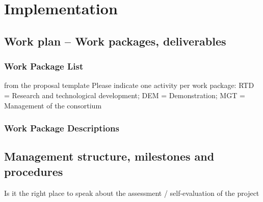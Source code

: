 \chapter{Implementation}\label{chap:implementation}

\section{Work plan -- Work packages, deliverables}



\subsection{Work Package List}\label{sec:wplist}

\begin{todo}{from the proposal template}
Please indicate one activity per work package:
RTD = Research and technological development; DEM = Demonstration; MGT = Management of the consortium
\end{todo}

\wpfigstyle{\footnotesize}

\newpage
\newpage

\subsection{Work Package Descriptions}\label{sec:workpackages}
\begin{workplan}
  \newpage
  \newpage
  \newpage
  \newpage
  \newpage
  \newpage
  \newpage
  \newpage
  \newpage
  \newpage
\end{workplan}
\ganttchart[draft,xscale=.45] 
\newpage\newpage

\section{Management structure, milestones and procedures}

{\color{red} Is it the right place to speak about the assessment /
  self-evaluation of the project}

